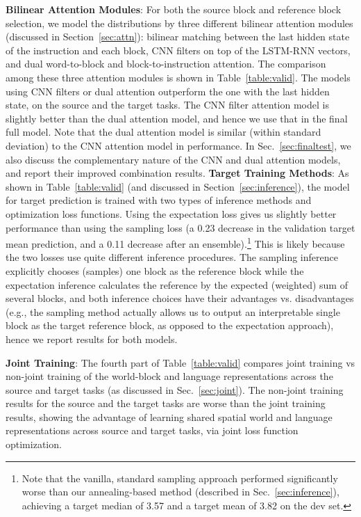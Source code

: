 \documentclass[letterpaper]{article} %
\begin{document}
\textbf{Bilinear Attention Modules}:
For both the source block and reference block selection, we model the distributions by three different bilinear attention modules (discussed in Section~\ref{sec:attn}): bilinear matching between the last hidden state of the instruction and each block, CNN filters on top of the LSTM-RNN vectors, and dual word-to-block and block-to-instruction attention. The comparison among these three attention modules is shown in Table~\ref{table:valid}.
The models using CNN filters or dual attention outperform the one with the last hidden state, on the source and the target tasks. The CNN filter attention model is slightly better than the dual attention model, and hence we use that in the final full model. Note that the dual attention model is similar (within standard deviation) to the CNN attention model in performance. In Sec.~\ref{sec:finaltest}, we also discuss the complementary nature of the CNN and dual attention models, and report their improved combination results.  \textbf{Target Training Methods}:
As shown in Table~\ref{table:valid} (and discussed in Section~\ref{sec:inference}), the model for target prediction is trained with two types of inference methods and optimization loss functions. Using the expectation loss gives us slightly better performance than using the sampling loss (a 0.23 decrease in the validation target mean prediction, and a 0.11 decrease after an ensemble).\footnote{Note that the vanilla, standard sampling approach performed significantly worse than our annealing-based method (described in Sec.~\ref{sec:inference}), achieving a target median of 3.57 and a target mean of 3.82 on the dev set.}
This is likely because the two losses use quite different inference procedures. The sampling inference explicitly chooses (samples) one block as the reference block while the expectation inference calculates the reference by the expected (weighted) sum of several blocks, and both inference choices have their advantages vs. disadvantages (e.g., the sampling method actually allows us to output an interpretable single block as the target reference block, as opposed to the expectation approach), hence we report results for both models.


\textbf{Joint Training}:
The fourth part of Table~\ref{table:valid} compares  joint training vs non-joint training of the world-block and language representations across the source and target tasks (as discussed in Sec.~\ref{sec:joint}). The non-joint training results for the source and the target tasks are worse than the joint training results, showing the advantage of learning shared spatial world and language representations across source and target tasks, via joint loss function optimization.
\end{document}
